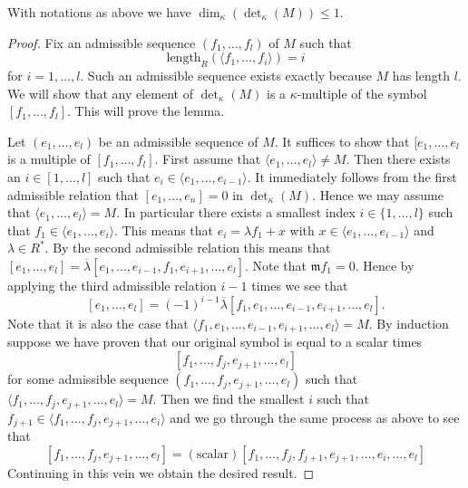 \begin{lemma}
\label{lemma-dimension-at-most-one}
With notations as above we have $\dim_\kappa(\det_\kappa(M)) \leq 1$.
\end{lemma}

\begin{proof}
Fix an admissible sequence $(f_1, \ldots, f_l)$ of $M$ such that
$$
\text{length}_R(\langle f_1, \ldots, f_i\rangle) = i
$$
for $i = 1, \ldots, l$. Such an admissible sequence exists exactly because
$M$ has length $l$. We will show that any element of 
$\det_\kappa(M)$ is a $\kappa$-multiple of the symbol
$[f_1, \ldots, f_l]$. This will prove the lemma.

\medskip\noindent
Let $(e_1, \ldots, e_l)$ be an admissible sequence of $M$.
It suffices to show that $[e_1, \ldots, e_l$ is a multiple
of $[f_1, \ldots, f_l]$. First assume that
$\langle e_1, \ldots, e_l\rangle \not = M$. Then there exists
an $i \in [1, \ldots, l]$ such that
$e_i \in \langle e_1, \ldots, e_{i - 1}\rangle$. It immediately
follows from the first admissible relation that
$[e_1, \ldots, e_n] = 0$ in $\det_\kappa(M)$.
Hence we may assume that $\langle e_1, \ldots, e_l\rangle = M$.
In particular there exists a smallest index $i \in \{1, \ldots, l\}$
such that $f_1 \in \langle e_1, \ldots, e_i\rangle$. This means
that $e_i = \lambda f_1 + x$ with
$x \in \langle e_1, \ldots, e_{i - 1}\rangle$ and $\lambda \in R^*$.
By the second admissible relation this means that
$[e_1, \ldots, e_l] = 
\overline{\lambda}[e_1, \ldots, e_{i - 1}, f_1, e_{i + 1}, \ldots, e_l]$.
Note that $\mathfrak m f_1 = 0$. Hence by applying the third
admissible relation $i - 1$ times we see that
$$
[e_1, \ldots, e_l] = 
(-1)^{i - 1}\overline{\lambda}
[f_1, e_1, \ldots, e_{i - 1}, e_{i + 1}, \ldots, e_l].
$$
Note that it is also the case that
$ \langle f_1, e_1, \ldots, e_{i - 1}, e_{i + 1}, \ldots, e_l\rangle = M$.
By induction suppose we have proven that our original
symbol is equal to a scalar times
$$
[f_1, \ldots, f_j, e_{j + 1}, \ldots, e_l]
$$
for some admissible sequence $(f_1, \ldots, f_j, e_{j + 1}, \ldots, e_l)$
such that $\langle f_1, \ldots, f_j, e_{j + 1}, \ldots, e_l\rangle = M$.
Then we find the smallest $i$ such that
$f_{j + 1} \in \langle f_1, \ldots, f_j, e_{j + 1}, \ldots, e_i\rangle$
and we go through the same process as above to see that
$$
[f_1, \ldots, f_j, e_{j + 1}, \ldots, e_l]
=
(\text{scalar}) [f_1, \ldots, f_j, f_{j + 1}, e_{j + 1},
\ldots, \hat{e_i}, \ldots, e_l]
$$
Continuing in this vein we obtain the desired result.
\end{proof}

